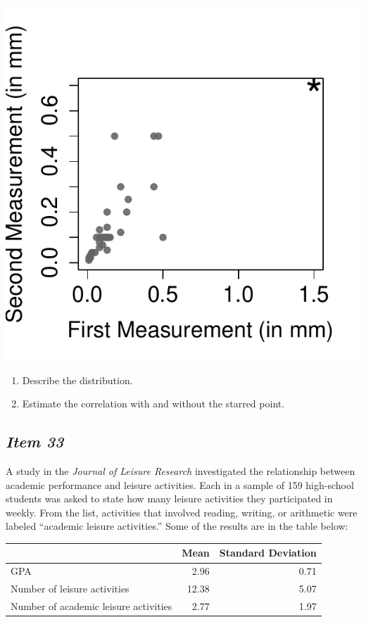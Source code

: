 \documentclass[twoside,openany]{tufte-book}
\begin{document}
\begin{marginfigure}
\includegraphics{Item32_R.pdf}
\end{marginfigure}
 
\begin{enumerate}[leftmargin=1cm, itemsep=.2em]
\item Describe the distribution.
\item Estimate the correlation with and without the starred point.
\end{enumerate}

\subsection{\textbf{\textit{Item 33}}}
A study in the \textit{Journal of Leisure Research} investigated the relationship between academic performance and leisure activities.  Each in a sample of 159 high-school students was asked to state how many leisure activities they participated in weekly.  From the list, activities that involved reading, writing, or arithmetic were labeled ``academic leisure activities.'' Some of the results are in the table below:

\begin{table}[!ht]
\begin{center}
\begin{tabular}{lrr}
\hline
& Mean & Standard Deviation\\
\hline
GPA & 2.96 & 0.71\\
Number of leisure activities & 12.38 & 5.07\\
Number of academic leisure activities & 2.77 & 1.97\\
\hline
\end{tabular}
\end{center}
\end{table}
\end{document}
